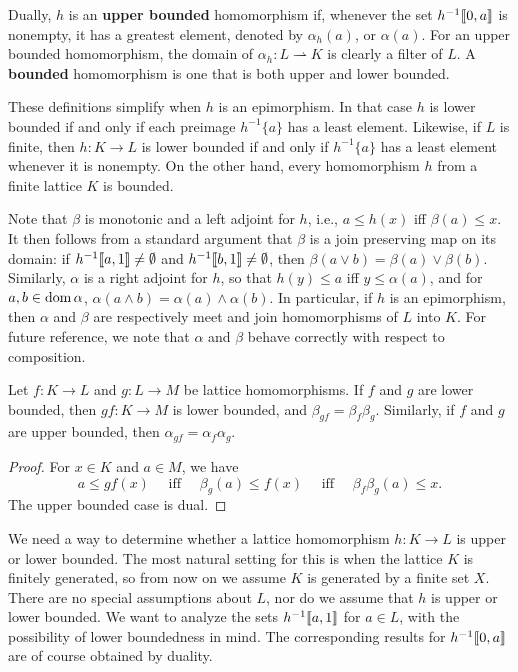Dually, $h$ is an \textbf{upper bounded} homomorphism if, whenever the set
$h^{-1}\llbracket 0, a \rrbracket$ is nonempty, it has a greatest element, denoted by 
$\alpha_h(a)$, or $\alpha (a)$.
For an upper bounded homomorphism, the domain of $\alpha_h \colon L \rightharpoonup K$ 
is clearly a filter of $L$.  
A \textbf{bounded} homomorphism is one that is both upper and lower bounded.

These definitions simplify when $h$ is an epimorphism.
In that case $h$ is lower bounded if and only if each preimage 
$h^{-1}\{ a \}$ has a least element.
Likewise, if $L$ is finite, then $h \colon K \to L$ is lower bounded if and
only if $h^{-1}\{a\}$ has a least element whenever it is nonempty. 
On the other hand, every homomorphism $h$ from a finite lattice $K$ is bounded.

Note that $\beta$  is monotonic and a left adjoint for $h$, i.e., $a \leq h(x)$ iff
$\beta (a) ≤ x$. It then follows from a standard argument that $\beta$  is a join
preserving map on its domain: if $h^{-1}\llbracket a, 1 \rrbracket \neq \emptyset$ and
$h^{-1}\llbracket b, 1 \rrbracket \neq \emptyset$, then
$\beta (a \vee b) = \beta (a) \vee \beta (b)$.
Similarly, $\alpha$  is a right adjoint for $h$, so that $h(y) \leq a$ iff
$y \leq \alpha (a)$, and for $a, b \in \operatorname{dom} \alpha$,
$\alpha (a \wedge b) = \alpha (a) \wedge \alpha (b)$.
In particular, if $h$ is an epimorphism, then $\alpha$  and $\beta$  are respectively
meet and join homomorphisms of $L$ into $K$.
For future reference, we note that $\alpha$  and $\beta$  behave correctly with
respect to composition.

\begin{theorem}
  Let $f \colon  K \to L$ and $g \colon L \to M$ be lattice
  homomorphisms. If $f$ and $g$ are lower bounded, then $gf \colon K \to M$ is lower
  bounded, and $\beta_{gf} = \beta_f \beta_g$. Similarly, if $f$ and $g$
  are upper bounded, then $\alpha_{gf} = \alpha_f \alpha_g$.
\end{theorem}
\begin{proof}  For $x \in K$ and $a \in M$, we have
  \[ a \leq gf (x) \quad \text{ iff } \quad \beta_g(a) \leq f (x)
  \quad \text{ iff } \quad \beta_f \beta_g (a) \leq x.
  \]
  The upper bounded case is dual.
\end{proof}

We need a way to determine whether a lattice homomorphism
$h\colon K \to L$
is upper or lower bounded. The most natural setting for this is
when the lattice $K$ is finitely generated, so from now on 
we assume $K$ is generated by a finite set $X$.
There are no special assumptions about $L$, nor do we assume that
$h$ is upper or lower bounded. We want to analyze the sets
$h^{-1}\llbracket a, 1 \rrbracket$
for $a \in L$, with the possibility of lower boundedness in mind.
The corresponding results for
$h^{-1}\llbracket 0, a\rrbracket$
are of course obtained by duality.

